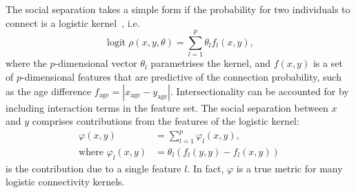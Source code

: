 \documentclass{scrartcl}
\DeclareMathOperator{\logit}{logit}
\newcommand{\abs}[1]{\left|#1\right|}
\begin{document}
The social separation takes a simple form if the probability for two individuals to connect is a logistic kernel~\cite{Hoff2002}, i.e.\
\begin{equation}
    \logit\rho(x, y, \theta) = \sum_{l=1}^p\theta_l f_l(x,y),\label{eq:logistic-kernel}
\end{equation}
where the $p$-dimensional vector $\theta_l$ parametrises the kernel, and $f(x, y)$ is a set of $p$-dimensional features that are predictive of the connection probability, such as the age difference $f_\text{age}=\abs{x_\mathrm{age}-y_\mathrm{age}}$. Intersectionality can be accounted for by including interaction terms in the feature set. The social separation between $x$ and $y$ comprises contributions from the features of the logistic kernel:
\begin{align}
    \varphi(x,y) &= \sum_{l=1}^p\varphi_l(x, y),\label{eq:social-separation-logistic}\\
    \text{where }\varphi_l(x, y) &= \theta_l\left(f_l(y, y) - f_l(x, y)\right)\label{eq:social-separation-contribution}
\end{align}
is the contribution due to a single feature $l$. In fact, $\varphi$ is a true metric for many logistic connectivity kernels.
\end{document}

